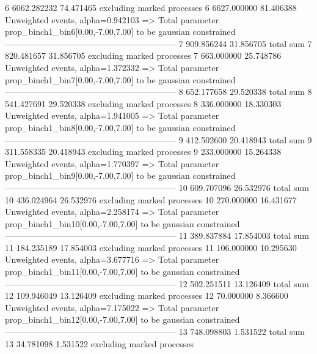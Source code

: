 6          6062.282232     74.471465       excluding marked processes    
6          6627.000000     81.406388       Unweighted events, alpha=0.942103
  => Total parameter prop_binch1_bin6[0.00,-7.00,7.00] to be gaussian constrained
------------------------------------------------------------
7          909.856244      31.856705       total sum                     
7          820.481657      31.856705       excluding marked processes    
7          663.000000      25.748786       Unweighted events, alpha=1.372332
  => Total parameter prop_binch1_bin7[0.00,-7.00,7.00] to be gaussian constrained
------------------------------------------------------------
8          652.177658      29.520338       total sum                     
8          541.427691      29.520338       excluding marked processes    
8          336.000000      18.330303       Unweighted events, alpha=1.941005
  => Total parameter prop_binch1_bin8[0.00,-7.00,7.00] to be gaussian constrained
------------------------------------------------------------
9          412.502600      20.418943       total sum                     
9          311.558335      20.418943       excluding marked processes    
9          233.000000      15.264338       Unweighted events, alpha=1.770397
  => Total parameter prop_binch1_bin9[0.00,-7.00,7.00] to be gaussian constrained
------------------------------------------------------------
10         609.707096      26.532976       total sum                     
10         436.024964      26.532976       excluding marked processes    
10         270.000000      16.431677       Unweighted events, alpha=2.258174
  => Total parameter prop_binch1_bin10[0.00,-7.00,7.00] to be gaussian constrained
------------------------------------------------------------
11         389.837884      17.854003       total sum                     
11         184.235189      17.854003       excluding marked processes    
11         106.000000      10.295630       Unweighted events, alpha=3.677716
  => Total parameter prop_binch1_bin11[0.00,-7.00,7.00] to be gaussian constrained
------------------------------------------------------------
12         502.251511      13.126409       total sum                     
12         109.946049      13.126409       excluding marked processes    
12         70.000000       8.366600        Unweighted events, alpha=7.175022
  => Total parameter prop_binch1_bin12[0.00,-7.00,7.00] to be gaussian constrained
------------------------------------------------------------
13         748.098803      1.531522        total sum                     
13         34.781098       1.531522        excluding marked processes    
